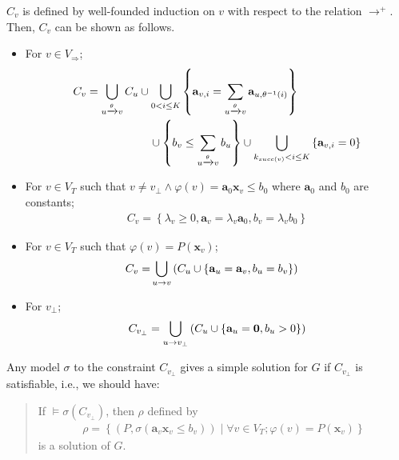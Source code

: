 $C_v$ is defined by well-founded induction on $v$ with respect to the
relation $\rightarrow^+$. Then, $C_v$ can be shown as follows.
\begin{itemize}
\item For $v \in V_\Rightarrow$;
\begin{align*}
C_v & =
 \bigcup_{u\xrightarrow{\theta}v} C_u \cup
 \bigcup_{0 < i \leq K}
 \left\lbrace
  \mathbf{a}_{v,i} = \sum_{u\xrightarrow{\theta}v} \mathbf{a}_{u, \theta^{-1} (i)}
 \right\rbrace \\
 & \hspace{2cm} \cup
 \left\lbrace
  b_v \leq \sum_{u\xrightarrow{\theta}v} b_u
 \right\rbrace \cup
 \bigcup_{k_{succ(v)} < i \leq K}
 \left\lbrace \mathbf{a}_{v,i} = 0 \right\rbrace
\end{align*}
\item For $v \in V_T$ such that
  $v \neq v_{\bot} \wedge \varphi(v) = \mathbf{a}_0 \mathbf{x}_v \leq b_0$
  where $\mathbf{a}_0$ and $b_0$ are constants;
\begin{align*}
C_v =
\left\lbrace
 \lambda_v \geq 0, \mathbf{a}_v = \lambda_v \mathbf{a}_0,
 b_v = \lambda_v b_0
\right\rbrace
\end{align*}
\item For $v \in V_T$ such that $\varphi(v) = P(\mathbf{x}_v)$;
\begin{align*}
C_v = & \bigcup_{u\rightarrow v} \left( C_{u} \cup
\left\lbrace \mathbf{a}_u = \mathbf{a}_v, b_u = b_v \right\rbrace
\right)
\end{align*}
\item For $v_\bot$;
\begin{align*}
C_{v_\bot} = \bigcup_{u\rightarrow v_\bot} \left( C_{u} \cup
\left\lbrace \mathbf{a}_u = \mathbf{0}, b_u > 0 \right\rbrace \right)
\end{align*}
\end{itemize}

Any model $\sigma$ to the constraint $C_{v_\bot}$ gives a simple
solution for $G$ if $C_{v_\bot}$ is satisfiable, i.e., we should have:

\begin{quote}
If $\models \sigma(C_{v_\bot})$, then $\rho$ defined by
\begin{align*}
 \rho = \left\lbrace
  \left( P, \sigma(\mathbf{a}_v \mathbf{x}_v \leq b_v) \right) \mid
  \forall v \in V_T; \varphi(v) = P(\mathbf{x}_v)
 \right\rbrace
\end{align*}
is a solution of $G$.
\end{quote}

